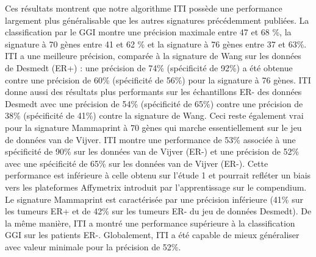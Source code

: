 		Ces résultats montrent que notre algorithme ITI possède une performance largement plus généralisable que les autres signatures précédemment publiées.
		La classification par le GGI montre une précision maximale entre 47 et 68 \%, la signature à 70 gènes entre 41 et 62 \% et la signature à 76 gènes entre 37 et 63\%.
		ITI a une meilleure précision, comparée à la signature de Wang sur les données de Desmedt (ER+) : une précision de 74\% (spécificité de 92\%) a été obtenue contre une précision de 60\% (spécificité de 56\%) pour la signature à 76 gènes.
		ITI donne aussi des résultats plus performants sur les échantillons ER- des données Desmedt avec une précision de 54\% (spécificité de 65\%) contre une précision de 38\% (spécificité de 41\%) contre la signature de Wang.
		Ceci reste également vrai pour la signature Mammaprint à 70 gènes qui marche essentiellement sur le jeu de données van de Vijver.
		ITI montre une performance de 53\% associée à une spécificité de 90\% sur les données van de Vijver (ER-) et une précision de 52\% avec une spécificité de 65\% sur les données van de Vijver (ER-). 
		Cette performance est inférieure à celle obtenu sur l'étude 1 et pourrait refléter un biais vers les plateformes Affymetrix introduit par l'apprentissage sur le compendium. 
		Le signature Mammaprint est caractérisée par une précision inférieure (41\% sur les tumeurs ER+ et de 42\% sur les tumeurs ER- du jeu de données Desmedt).
		De la même manière, ITI a montré une performance supérieure à la classification GGI sur les patients ER-.
		Globalement, ITI a été capable de mieux généraliser avec valeur minimale pour la précision de 52\%.

